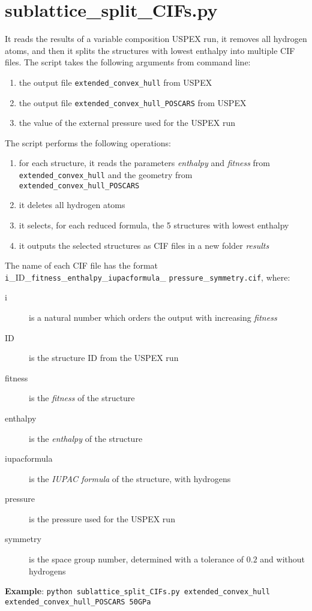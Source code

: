\documentclass{article}
\begin{document}
\section{sublattice\_split\_CIFs.py}
It reads the results of a variable composition USPEX run, it removes all hydrogen atoms, and then it splits the structures with lowest enthalpy into multiple CIF files. The script takes the following arguments from command line:
\begin{enumerate}
	\item the output file \texttt{extended\_convex\_hull} from USPEX
	\item the output file \texttt{extended\_convex\_hull\_POSCARS} from USPEX
	\item the value of the external pressure used for the USPEX run
\end{enumerate}
The script performs the following operations:
\begin{enumerate}
	\item for each structure, it reads the parameters \emph{enthalpy} and \emph{fitness} from \texttt{extended\_convex\_hull} and the geometry from \texttt{extended\_convex\_hull\_POSCARS}
	\item it deletes all hydrogen atoms
	\item it selects, for each reduced formula, the 5 structures with lowest enthalpy
	\item it outputs the selected structures as CIF files in a new folder \textit{results}
\end{enumerate}
The name of each CIF file has the format \texttt{i}\_ID\_\texttt{fitness}\_\texttt{enthalpy}\_\texttt{iupacformula}\_ \texttt{pressure}\_\texttt{symmetry.cif}, where:
\begin{description}
	\item[i] is a natural number which orders the output with increasing \emph{fitness}
	\item[ID] is the structure ID from the USPEX run
	\item[fitness] is the \emph{fitness} of the structure
	\item[enthalpy] is the \emph{enthalpy} of the structure
	\item[iupacformula] is the \emph{IUPAC formula} of the structure, with hydrogens
	\item[pressure] is the pressure used for the USPEX run
	\item[symmetry] is the space group number, determined with a tolerance of $0.2$ and without hydrogens
\end{description}
\textbf{Example}: \texttt{python sublattice\_split\_CIFs.py extended\_convex\_hull \\ extended\_convex\_hull\_POSCARS 50GPa}
\end{document}
